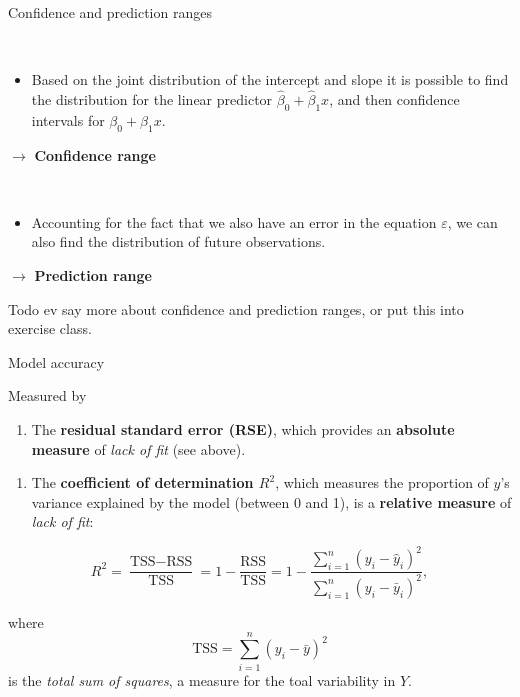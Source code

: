 \documentclass[10pt,ignorenonframetext,]{beamer}
\providecommand{\tightlist}{%
  \setlength{\itemsep}{0pt}\setlength{\parskip}{0pt}}
\begin{document}
\begin{frame}

\begin{block}{Confidence and prediction ranges}

\(~\)

\begin{itemize}
\tightlist
\item
  Based on the joint distribution of the intercept and slope it is
  possible to find the distribution for the linear predictor
  \(\hat{\beta}_0+\hat{\beta}_1 x\), and then confidence intervals for
  \(\beta_0+\beta_1 x\).
\end{itemize}

\(\rightarrow\) \textbf{Confidence range}

\(~\)

\begin{itemize}
\tightlist
\item
  Accounting for the fact that we also have an error in the equation
  \(\varepsilon\), we can also find the distribution of future
  observations.
\end{itemize}

\(\rightarrow\) \textbf{Prediction range}

\end{block}

\end{frame}

\begin{frame}

Todo ev say more about confidence and prediction ranges, or put this
into exercise class.

\end{frame}

\begin{frame}{Model accuracy}

Measured by

\begin{enumerate}
\def\labelenumi{\arabic{enumi}.}
\tightlist
\item
  The \textbf{residual standard error (RSE)}, which provides an
  \textbf{absolute measure} of \emph{lack of fit} (see above).
\end{enumerate}

\vspace{2mm}

\begin{enumerate}
\def\labelenumi{\arabic{enumi}.}
\setcounter{enumi}{1}
\tightlist
\item
  The \textbf{coefficient of determination \(R^2\)}, which measures the
  proportion of \(y\)'s variance explained by the model (between 0 and
  1), is a \textbf{relative measure} of \emph{lack of fit}:
\end{enumerate}

\[R^2 = \frac{\text{TSS}-\text{RSS}}{\text{TSS}}= 1-\frac{\text{RSS}}{\text{TSS}}=1-\frac{\sum_{i=1}^n(y_i-\hat{y}_i)^2}{\sum_{i=1}^n(y_i-\bar{y}_i)^2}, \]

where \[\text{TSS} = \sum_{i=1}^n (y_i - \bar{y})^2\] is the \emph{total
sum of squares}, a measure for the toal variability in \(Y\).

\end{frame}
\end{document}
